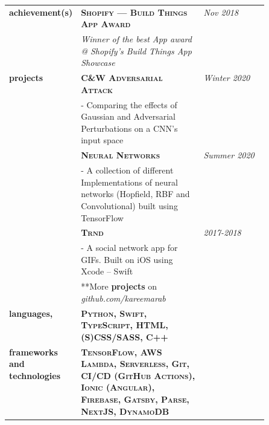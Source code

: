 \documentclass{article}
\begin{document}
\begin{longtable}{@{}>{\raggedleft}p{0.25\linewidth}
                          p{}>{}p{0.25\linewidth}@{}}
        \textbf{achievement(s)}
            & \textbf{\textsc{Shopify --- Build Things App Award}} & \textit{Nov 2018} \\
            & \textit{Winner of the best App award @ Shopify's Build Things App Showcase} \\ [1em]

        \textbf{projects}
            & \textbf{\textsc{C\&W Adversarial Attack}} & \textit{Winter 2020} \\
            & - Comparing the effects of Gaussian and Adversarial Perturbations on a CNN's input space \\ [2em]

            & \textbf{\textsc{Neural Networks}} & \textit{Summer 2020} \\
            & - A collection of different Implementations of neural networks (Hopfield, RBF and Convolutional) built using TensorFlow \\ [2em]

            & \textbf{\textsc{Trnd}} & \textit{2017-2018} \\
            & - A social network app for GIFs. Built on iOS using Xcode -- Swift \\ [1em]

            & **More \textbf{projects} on \textit{github.com/kareemarab}\\ [1em]

        \textbf{languages,}
            & \textbf{\textsc{Python, Swift, TypeScript, HTML, (S)CSS/SASS, C++}} \\
        \textbf{frameworks and technologies}
            & \textbf{\textsc{TensorFlow, AWS Lambda, Serverless, Git, CI/CD (GitHub Actions), Ionic (Angular), Firebase, Gatsby, Parse, NextJS, DynamoDB}}\\ [1em]

  \end{longtable}
\end{document}
